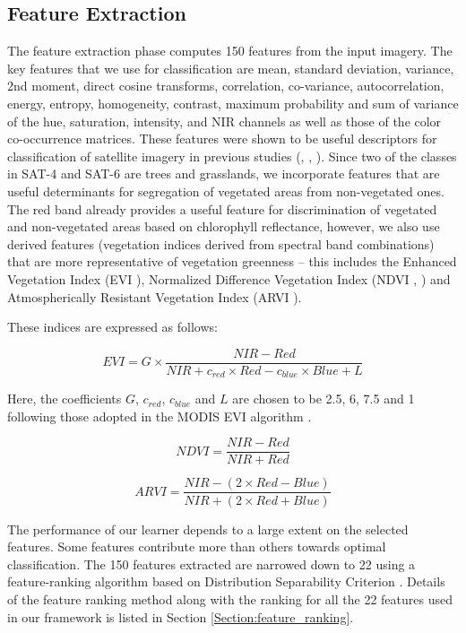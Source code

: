 \documentclass[11pt,a4paper]{article}
\begin{document}
\subsection{Feature Extraction}
The feature extraction phase computes 150 features from the input imagery.  The key features that we use for classification are mean, standard deviation, variance, 2nd moment, direct cosine transforms, correlation, co-variance, autocorrelation, energy, entropy, homogeneity, contrast, maximum probability and sum of variance of the hue, saturation, intensity, and NIR channels as well as those of the color co-occurrence matrices. These features were shown to be useful descriptors for classification of satellite imagery in previous studies (\cite{haralick1973}, \cite{Soh99textureanalysis}, \cite{Clausi2002}). Since two of the classes in SAT-4 and SAT-6 are trees and grasslands, we incorporate features that are useful determinants for segregation of vegetated areas from non-vegetated ones. The red band already provides a useful feature for discrimination of vegetated and non-vegetated areas based on chlorophyll reflectance, however, we also use derived features (vegetation indices derived from spectral band combinations) that are more representative of vegetation greenness -- this includes the Enhanced Vegetation Index (EVI \cite{huete2002}), Normalized Difference Vegetation Index (NDVI \cite{rouse1974}, \cite{Tucker1979127}) and Atmospherically Resistant Vegetation Index (ARVI \cite{kaufman1992}).

These indices are expressed as follows:

\begin{equation}
EVI = G\times\frac{NIR-Red}{NIR+c_{red}\times{Red}-c_{blue}\times{Blue}+L}
\end{equation}

Here, the coefficients $G$, $c_{red}$, $c_{blue}$ and $L$ are chosen to be 2.5, 6, 7.5 and 1 following those adopted in the MODIS EVI algorithm \cite{modis}.

\begin{equation}
NDVI = \frac{NIR-Red}{NIR+Red}
\end{equation}

\begin{equation}
ARVI = \frac{NIR-(2\times{Red}-Blue)}{NIR+(2\times{Red}+Blue)}
\end{equation}

The performance of our learner depends to a large extent on the selected features. Some features contribute more than others towards optimal classification. The 150 features extracted are narrowed down to 22 using a feature-ranking algorithm based on Distribution Separability Criterion \cite{Boureau10atheoretical}. Details of the feature ranking method along with the ranking for all the 22 features used in our framework is listed in Section \ref{Section:feature_ranking}. 
\end{document}
